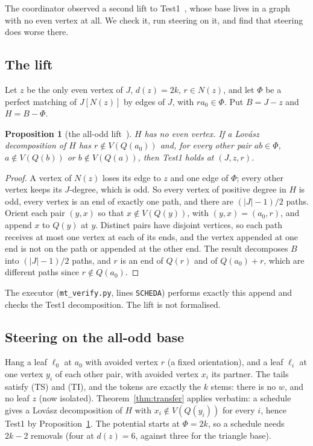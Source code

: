 \documentclass[11pt]{amsart}
\newtheorem{proposition}[theorem]{Proposition}
\theoremstyle{definition}
\begin{document}
The coordinator observed a second lift to Test1~\cite[\S31]{SYN}, whose base lives in a graph with
no even vertex at all. We check it, run steering on it, and find that steering does worse there.

\subsection*{The lift} Let $z$ be the only even vertex of $J$, $d(z)=2k$, $r\in N(z)$, and let
$\Phi$ be a perfect matching of $J[N(z)]$ by edges of $J$, with $ra_0\in\Phi$. Put $B=J-z$ and
$H=B-\Phi$.

\begin{proposition}[the all-odd lift~{\cite[\S31]{SYN}}]\label{prop:aoddlift}
$H$ has no even vertex. If a Lov\'asz decomposition of $H$ has $r\notin V(Q(a_0))$ and, for every
other pair $ab\in\Phi$, $a\notin V(Q(b))$ or $b\notin V(Q(a))$, then Test1 holds at $(J,z,r)$.
\end{proposition}

\begin{proof}
A vertex of $N(z)$ loses its edge to $z$ and one edge of $\Phi$; every other vertex keeps its
$J$-degree, which is odd. So every vertex of positive degree in $H$ is odd, every vertex is an end of
exactly one path, and there are $(|J|-1)/2$ paths. Orient each pair $(y,x)$ so that $x\notin
V(Q(y))$, with $(y,x)=(a_0,r)$, and append $x$ to $Q(y)$ at $y$. Distinct pairs have disjoint
vertices, so each path receives at most one vertex at each of its ends, and the vertex appended at
one end is not on the path or appended at the other end. The result decomposes $B$ into $(|J|-1)/2$
paths, and $r$ is an end of $Q(r)$ and of $Q(a_0)+r$, which are different paths since $r\notin
Q(a_0)$.
\end{proof}

The executor (\texttt{mt\_verify.py}, lines \texttt{SCHEDA}) performs exactly this append and checks
the Test1 decomposition. The lift is not formalised.

\subsection*{Steering on the all-odd base} Hang a leaf $\ell_0$ at $a_0$ with avoided vertex $r$ (a
fixed orientation), and a leaf $\ell_i$ at one vertex $y_i$ of each other pair, with avoided vertex
$x_i$ its partner. The tails satisfy (TS) and (TI), and the tokens are exactly the $k$ stems:
there is no $w$, and no leaf $z$ (now isolated). Theorem~\ref{thm:transfer} applies verbatim: a
schedule gives a Lov\'asz decomposition of $H$ with $x_i\notin V(Q(y_i))$ for every $i$, hence Test1
by Proposition~\ref{prop:aoddlift}. The potential starts at $\Phi=2k$, so a schedule needs $2k-2$
removals (four at $d(z)=6$, against three for the triangle base).
\end{document}
